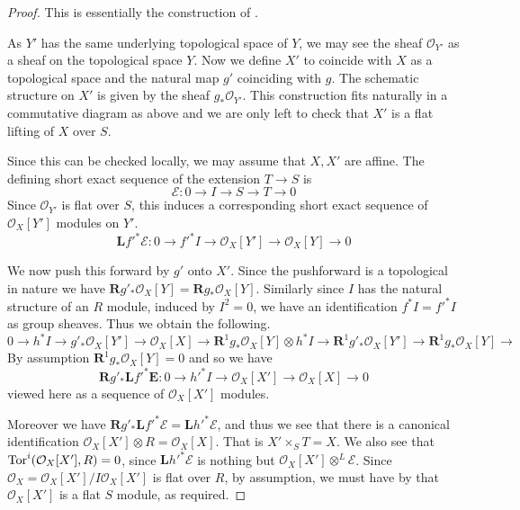 \documentclass[a4paper,12pt]{book}
\newcommand{\ox}{\mathcal{O}_{X}}
\begin{document}
\begin{proof}
	
	This is essentially the construction of \cite[Theorem 3.1]{cynk2009small}.
	
	As $Y'$ has the same underlying topological space of $Y$, we may see the sheaf $\mathcal{O}_{Y'}$ as a sheaf on the topological space $Y$. 	
	Now we define $X'$ to coincide with $X$ as a topological space and the natural map $g'$ coinciding with $g$. The schematic structure on $X'$ is given by the sheaf $g_*\mathcal{O}_{Y'}$. 
	This construction fits naturally in a commutative diagram as above and we are only left to check that $X'$ is a flat lifting of $X$ over $S$.
	
	Since this can be checked locally, we may assume that $X, X'$ are affine.
	The defining short exact sequence of the extension $T \to S$ is
	\[\mathcal{E} \colon 0 \to I \to S \to T \to 0 \]
	Since $\mathcal{O}_{Y'}$ is flat over $S$, this induces a corresponding short exact sequence of $\ox[Y']$ modules on $Y'$.
	\[ \mathbf{L}f'^{*}\mathcal{E} \colon 0 \to f'^{*}I \to \ox[Y'] \to \ox[Y] \to 0 \]
	
	We now push this forward by $g'$ onto $X'$. Since the pushforward is a topological in nature we have $\mathbf{R}g'_{*}\ox[Y]=\mathbf{R}g_{*}\ox[Y]$. Similarly since $I$ has the natural structure of an $R$ module, induced by $I^{2}=0$, we have an identification $f^{*}I=f'^{*}I$ as group sheaves.
	Thus we obtain the following.
	\[0 \to h^{*}I \to g'_{*}\ox[Y'] \to \ox[X] \to \mathbf{R}^{1}g_{*}\ox[Y] \otimes h^{*}I \to \mathbf{R}^{1}g'_{*}\ox[Y'] \to \mathbf{R}^{1}g_{*}\ox[Y] \to \] 
	By assumption $\mathbf{R}^{1}g_{*}\ox[Y]=0$ and so we have
	\[\mathbf{R}g'_{*}\mathbf{L}f'^{*}\mathbf{E}\colon 0 \to h'^{*}I \to \ox[X'] \to \ox[X] \to 0\]
	viewed here as a sequence of $\ox[X']$ modules.
	
	Moreover we have $\mathbf{R}g'_{*}\mathbf{L}f'^{*}\mathcal{E}=\mathbf{L}h'^{*}\mathcal{E}$, and thus we see that there is a canonical identification $\ox[X']\otimes R= \ox[X]$. That is $X' \times_{S} T= X$. We also see that $\textup{Tor}^{i}(\ox[X'], R)=0$, since $\mathbf{L}h'^{*}\mathcal{E}$ is nothing but $\ox[X'] \otimes^{L} \mathcal{E}$. Since $\ox= \ox[X']/ I \ox[X']$ is flat over $R$, by assumption, we must have by \cite[\href{https://stacks.math.columbia.edu/tag/0AS8}{Tag 0AS8}]{stacks-project} that $\ox[X']$ is a flat $S$ module, as required.
	
\end{proof}
\end{document}
